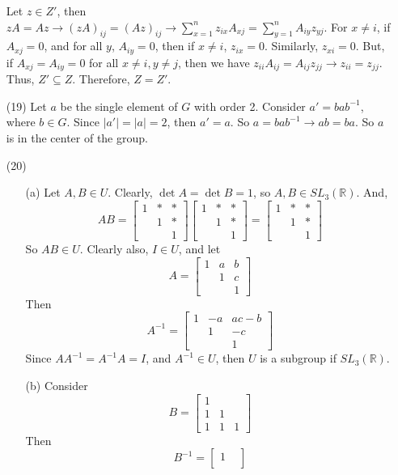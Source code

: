 \documentclass[12pt]{article}
\begin{document}
\begin{itemize}
Let $z \in Z'$, then $zA = Az \rightarrow (zA)_{ij} = (Az)_{ij} \rightarrow \sum_{x=1}^n z_{ix}A_{xj} = \sum_{y=1}^n A_{iy}z_{yj}$. For $x \neq i$, if $A_{xj} = 0$, and for all $y$, $A_{iy} = 0$, then if $x \neq i$, $z_{ix} = 0$. Similarly, $z_{xi} = 0$. But, if $A_{xj} = A_{iy} = 0$ for all $x \neq i, y \neq j$, then we have $z_{ii}A_{ij} = A_{ij}z_{jj} \rightarrow z_{ii} = z_{jj}$. Thus, $Z' \subseteq Z$. Therefore, $Z = Z'$.
\item[(19)]
Let $a$ be the single element of $G$ with order 2. Consider $a' = bab^{-1}$, where $b \in G$. Since $|a'| = |a| = 2$, then $a' = a$. So $a = bab^{-1} \rightarrow ab = ba$. So $a$ is in the center of the group.
\item[(20)]
\begin{itemize}
\item[(a)]
Let $A, B \in U$. Clearly, $\det A = \det B = 1$, so $A, B \in SL_3(\mathbb{R})$. And,
$$AB = \begin{bmatrix}
1 & * & * \\
& 1 & * \\
& & 1
\end{bmatrix}\begin{bmatrix}
1 & * & * \\
& 1 & * \\
& & 1
\end{bmatrix} = \begin{bmatrix}
1 & * & * \\
& 1 & * \\
& & 1
\end{bmatrix}$$
So $AB \in U$. Clearly also, $I \in U$, and let
$$A = \begin{bmatrix}
1 & a & b \\
& 1 & c \\
& & 1
\end{bmatrix}$$
Then
$$A^{-1} = \begin{bmatrix}
1 & -a & ac - b \\
& 1 & -c \\
& & 1
\end{bmatrix}$$
Since $AA^{-1} = A^{-1}A = I$, and $A^{-1} \in U$, then $U$ is a subgroup if $SL_3(\mathbb{R})$.
\item[(b)]
Consider
$$B = \begin{bmatrix}
1 \\
1 & 1 \\
1 & 1 & 1
\end{bmatrix}$$
Then
$$B^{-1} = \begin{bmatrix}
1 & \\

\end{bmatrix}$$
\end{itemize}
\end{itemize}
\end{document}
